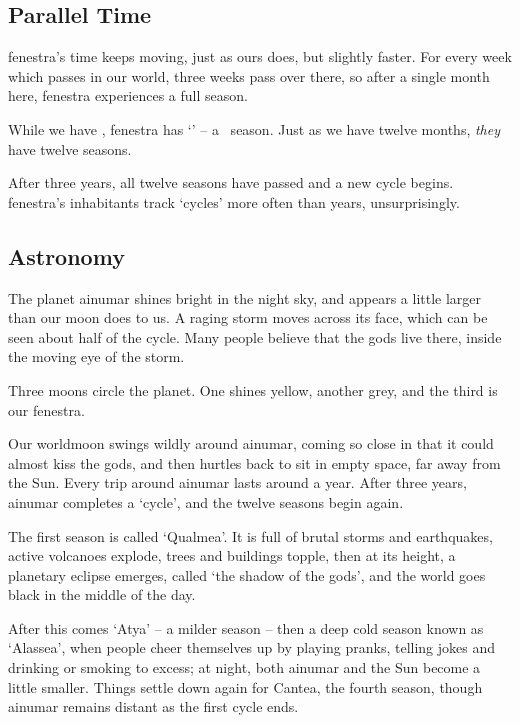 \begin{multicols}{2}

\subsection{Parallel Time}

\Gls{fenestra}'s time keeps moving, just as ours does, but slightly faster.
For every week which passes in our world, three weeks pass over there, so after a single month here, \gls{fenestra} experiences a full season.

While we have \trackMonth, \gls{fenestra} has `\showSeason' -- a \showTemperature\ season.
Just as we have twelve months, \emph{they} have twelve seasons.

After three years, all twelve seasons have passed and a new cycle begins.
\Gls{fenestra}'s inhabitants track `cycles' more often than years, unsurprisingly.

\subsection{Astronomy}

The planet \gls{ainumar} shines bright in the night sky, and appears a little larger than our moon does to us.
A raging storm moves across its face, which can be seen about half of the cycle.
Many people believe that the gods live there, inside the moving eye of the storm.

Three moons circle the planet.
One shines yellow, another grey, and the third is our \gls{fenestra}.

Our worldmoon swings wildly around \gls{ainumar}, coming so close in that it could almost kiss the gods, and then hurtles back to sit in empty space, far away from the Sun.
Every trip around \gls{ainumar} lasts around a year.
After three years, \gls{ainumar} completes a `cycle', and the twelve seasons begin again.

The first season is called `Qualmea'.
It is full of brutal storms and earthquakes, active volcanoes explode, trees and buildings topple, then at its height, a planetary eclipse emerges, called `the shadow of the gods', and the world goes black in the middle of the day.

After this comes `Atya' -- a milder season -- then a deep cold season known as `Alassea', when people cheer themselves up by playing pranks, telling jokes and drinking or smoking to excess; at night, both \gls{ainumar} and the Sun become a little smaller.
Things settle down again for Cantea, the fourth season, though \gls{ainumar} remains distant as the first cycle ends.


\end{multicols}
